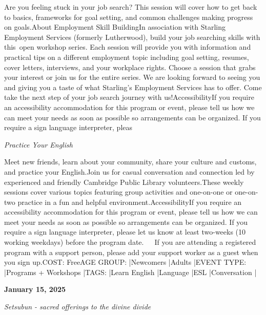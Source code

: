 \documentclass[letterpaper, 10pt]{article}
\newcommand{\headline}[1]{\textbf{\Large #1}\vspace{0.5em}}
\newcommand{\subtitle}[1]{\textit{\large #1}\vspace{0.5em}}
\newcommand{\articlecontent}[1]{\small #1\vspace{1em}}
\begin{document}
\begin{multicols}{2}
{Are you feeling stuck in your job search? This session will cover how to get back to basics, frameworks for goal setting, and common challenges making progress on goals.About Employment Skill BuildingIn association with Starling Employment Services (formerly Lutherwood), build your job searching skills with this open workshop series. Each session will provide you with information and practical tips on a different employment topic including goal setting, resumes, cover letters, interviews, and your workplace rights. Choose a session that grabs your interest or join us for the entire series. We are looking forward to seeing you and giving you a taste of what Starling's Employment Services has to offer. Come take the next step of your job search journey with us!AccessibilityIf you require an accessibility accommodation for this program or event, please tell us how we can meet your needs as soon as possible so arrangements can be organized. If you require a sign language interpreter, pleas
}
\vspace{10px}

\subtitle{Practice Your English}

\articlecontent{

\qrcode[height=1.5cm]{https://ideaexchange.libnet.info/event/12517661}
\vspace{10px}

Meet new friends, learn about your community, share your culture and customs, and practice your English.Join us for casual conversation and connection led by experienced and friendly Cambridge Public Library volunteers.These weekly sessions cover various topics featuring group activities and one-on-one or one-on-two practice in a fun and helpful environment.AccessibilityIf you require an accessibility accommodation for this program or event, please tell us how we can meet your needs as soon as possible so arrangements can be organized. If you require a sign language interpreter, please let us know at least two-weeks (10 working weekdays) before the program date.   If you are attending a registered program with a support person, please add your support worker as a guest when you sign up.COST: FreeAGE GROUP: |Newcomers |Adults |EVENT TYPE: |Programs + Workshops |TAGS: |Learn English |Language |ESL |Conversation |
}
\vspace{10px}

\headline{January 15, 2025}

\subtitle{Setsubun - sacred offerings to the divine divide}

\articlecontent{

}
\end{multicols}
\end{document}
